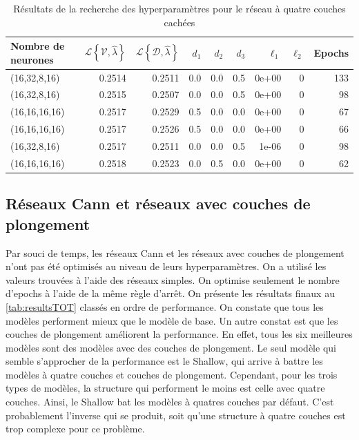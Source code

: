 \begin{table}
\centering
\caption{\label{tab:ResultsDeep4Tuning}Résultats de la recherche des hyperparamètres pour le réseau à quatre couches cachées}
\begin{tabularx}{0.9\textwidth}{Xrrrrrrrr}
\toprule
Nombre \newline de neurones & $\mathcal{L}\left\{\mathcal{V},\hat{\lambda} \right\} $ & $\mathcal{L}\left\{\mathcal{D},\hat{\lambda} \right\} $ & $d_1$ & $d_2$ & $d_3$ & $\ell_1$ & $\ell_2$ & Epochs\\
\midrule
(16,32,8,16) & 0.2514 & 0.2511 & 0.0 & 0.0 & 0.5 & 0e+00 & 0 & 133\\
(16,32,8,16) & 0.2515 & 0.2507 & 0.0 & 0.0 & 0.5 & 0e+00 & 0 & 98\\
(16,16,16,16) & 0.2517 & 0.2529 & 0.5 & 0.0 & 0.0 & 0e+00 & 0 & 67\\
(16,16,16,16) & 0.2517 & 0.2526 & 0.5 & 0.0 & 0.0 & 0e+00 & 0 & 66\\
(16,32,8,16) & 0.2517 & 0.2511 & 0.0 & 0.0 & 0.5 & 1e-06 & 0 & 98\\
\addlinespace
(16,16,16,16) & 0.2518 & 0.2523 & 0.0 & 0.5 & 0.0 & 0e+00 & 0 & 62\\
\bottomrule
\end{tabularx}
\end{table}

\subsection{Réseaux Cann et réseaux avec couches de plongement}
\label{subsec:CannEmbed}

Par souci de temps, les réseaux Cann et les réseaux avec couches de plongement n'ont pas été optimisés au niveau de leurs hyperparamètres. On a utilisé les valeurs trouvées à l'aide des réseaux simples. On optimise seulement le nombre d'epochs à l'aide de la même règle d'arrêt. On présente les résultats finaux au \autoref{tab:resultsTOT} classés en ordre de performance. On constate que tous les modèles performent mieux que le modèle de base. Un autre constat est que les couches de plongement améliorent la performance. En effet, tous les six meilleures modèles sont des modèles avec des couches de plongement.  Le seul modèle qui semble s'approcher de la performance est le Shallow, qui arrive à battre les modèles à quatre couches et couches de plongement. Cependant, pour les trois types de modèles, la structure qui performent le moins est celle avec quatre couches. Ainsi, le Shallow bat les modèles à quatres couches par défaut. C'est probablement l'inverse qui se produit, soit qu'une structure à quatre couches est trop complexe pour ce problème.

